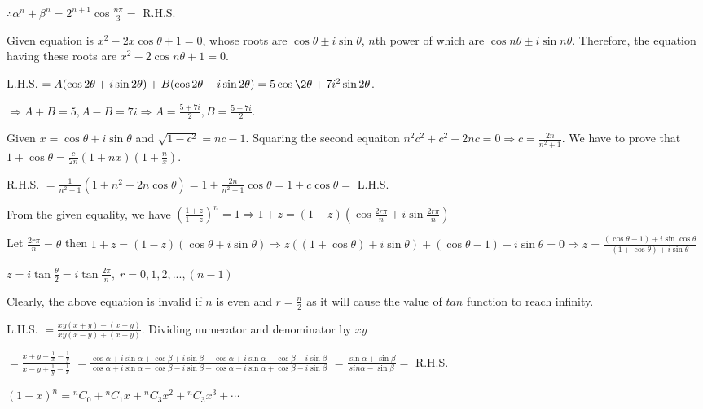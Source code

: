   $\therefore \alpha^n + \beta^n = 2^{n + 1}\cos\frac{n\pi}{3} =$ R.H.S.
\item Given equation is $x^2 - 2x\cos\theta + 1 = 0$, whose roots are $\cos\theta \pm i\sin\theta$, $n$th
  power of which are $\cos n\theta \pm i\sin n\theta$. Therefore, the equation having these roots are $x^2 -
  2\cos n\theta + 1 = 0$.
\item L.H.S. $= A(\cos2\theta + i\sin2\theta) + B(\cos2\theta - i\sin2\theta) = 5\cos\2\theta +
  7i^2\sin2\theta$.

  $\Rightarrow A + B = 5, A - B = 7i \Rightarrow A = \frac{5 + 7i}{2}, B = \frac{5 - 7i}{2}$.
\item Given $x = \cos\theta + i\sin\theta$ and $\sqrt{1 - c^2} = nc - 1$. Squaring the second equaiton
  $n^2c^2 + c^2 + 2nc  = 0 \Rightarrow c = \frac{2n}{n^2 + 1}$. We have to prove that $1 + \cos\theta =
  \frac{c}{2n}(1 + nx)\left(1 + \frac{n}{x}\right)$.

  R.H.S. $= \frac{1}{n^2 + 1}\left(1 + n^2 + 2n\cos\theta\right) = 1 + \frac{2n}{n^2 + 1}\cos\theta = 1 +
  c\cos\theta =$ L.H.S.
\item From the given equality, we have $\left(\frac{1+z}{1-z}\right)^n = 1\Rightarrow 1 + z = (1 -
  z)(\cos\frac{2r\pi}{n} +i \sin\frac{2r\pi}{n})$

  Let $\frac{2r\pi}{n} = \theta$ then $1 + z = (1 - z)(\cos\theta + i \sin\theta) \Rightarrow z((1 +
  \cos\theta) + i \sin\theta) + (\cos\theta - 1) + i \sin\theta = 0
  \Rightarrow z = \frac{(\cos\theta - 1) + i \sin\cos\theta}{(1 + \cos\theta) + i \sin\theta}$

  $z = i \tan\frac{\theta}{2} = i \tan\frac{2\pi}{n}, \; r = 0, 1, 2, ..., (n - 1)$

  Clearly, the above equation is invalid if $n$ is even and $r =
  \frac{n}{2}$ as it will cause the value of $tan$ function to reach infinity.
\item L.H.S. $= \frac{xy(x + y) - (x + y)}{xy(x - y)+(x - y)}$. Dividing numerator and denominator by $xy$

  $= \frac{x + y - \frac{1}{x} - \frac{1}{y}}{x - y + \frac{1}{y} - \frac{1}{x}}$
  $= \frac{\cos\alpha + i \sin\alpha + \cos\beta + i \sin\beta -
  \cos\alpha + i\sin\alpha - \cos\beta - i \sin\beta}{\cos\alpha + i
  \sin\alpha - \cos\beta - i \sin\beta - \cos\alpha - i\sin\alpha +
  \cos\beta - i \sin\beta}$
  $= \frac{\sin\alpha + \sin\beta}{sin\alpha - \sin\beta} =$ R.H.S.
\item $(1 + x)^n = {^nC_0} + {^nC_1}x + {^nC_3}x^2 + {^nC_3}x^3 + \cdots$

